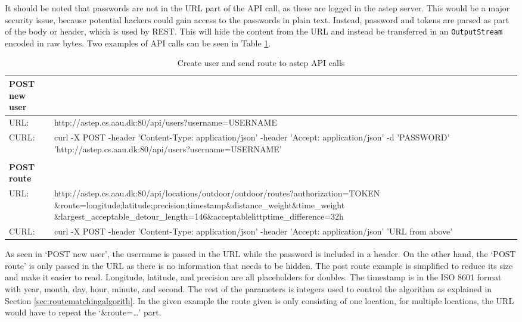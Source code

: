 It should be noted that passwords are not in the URL part of the API call, as these are logged in the \gls{astep} server. 
This would be a major security issue, because potential hackers could gain access to the passwords in plain text.
Instead, password and tokens are parsed as part of the body or header, which is used by REST. 
This will hide the content from the URL and instead be transferred in an \texttt{OutputStream} encoded in raw bytes. 
Two examples of API calls can be seen in Table \ref{tab:apitable}.

\begin{table}[h]
	\scriptsize
	\centering
	\begin{tabularx}{\textwidth}{l X}
		\textbf{POST new user} &  \\\toprule
		URL:          & http://astep.cs.aau.dk:80/api/users?username=USERNAME  \\
		\rowcolor{blue!10}
		CURL:         & curl -X POST -\-header 'Content-Type: application/json' -\-header 'Accept: application/json' -d 'PASSWORD' 'http://astep.cs.aau.dk:80/api/users?username=USERNAME' \\\\
		\textbf{POST route} & \\\toprule
		URL:          & http://astep.cs.aau.dk:80/api/locations/outdoor/outdoor/routes?authorization=TOKEN
						\&route=longitude;latitude;precision;timestamp\&distance\_weight\&time\_weight
						\&largest\_acceptable\_detour\_length=146\&acceptable\'httptime\_difference=32h\\ 
		\rowcolor{blue!10}
		CURL:         & curl -X POST -\-header 'Content-Type: application/json' -\-header 'Accept: application/json' 'URL from above' \\
	\end{tabularx}
	\caption{Create user and send route to \gls{astep} API calls}
	\label{tab:apitable}
\end{table}


As seen in `POST new user', the username is passed in the URL while the password is included in a header.
On the other hand, the `POST route' is only passed in the URL as there is no information that needs to be hidden.
The post route example is simplified to reduce its size and make it easier to read.
Longitude, latitude, and precision are all placeholders for doubles.
The timestamp is in the ISO 8601 format with year, month, day, hour, minute, and second.  
The rest of the parameters is integers used to control the algorithm as explained in Section \ref{sec:routematchingalgorith}. 
In the given example the route given is only consisting of one location, for multiple locations, the URL would have to repeat the \enquote*{\&route=\dots} part.

